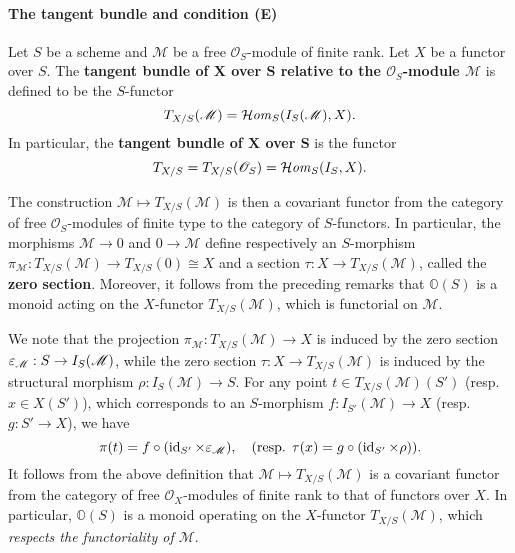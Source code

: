 \paragraph{The tangent bundle and condition (E)}
\begin{definition}
Let $S$ be a scheme and $\mathscr{M}$ be a free $\mathscr{O}_S$-module of finite rank. Let $X$ be a functor over $S$. The \textbf{tangent bundle of $\bm{X}$ over $\bm{S}$ relative to the $\mathscr{O}_S$-module $\mathscr{M}$} is defined to be the $S$-functor
\[T_{X/S}(\mathscr{M})=\operatorname{\mathcal{H}\hspace*{-0.4pt}\textit{om}\hspace{0.5pt}}_S(I_S(\mathscr{M}),X).\]
In particular, the \textbf{tangent bundle of $\bm{X}$ over $\bm{S}$} is the functor
\[T_{X/S}=T_{X/S}(\mathscr{O}_S)=\operatorname{\mathcal{H}\hspace*{-0.4pt}\textit{om}\hspace{0.5pt}}_S(I_S,X).\]
\end{definition}

The construction $\mathscr{M}\mapsto T_{X/S}(\mathscr{M})$ is then a covariant functor from the category of free $\mathscr{O}_S$-modules of finite type to the category of $S$-functors. In particular, the morphisms $\mathscr{M}\to 0$ and $0\to\mathscr{M}$ define respectively an $S$-morphism $\pi_\mathscr{M}:T_{X/S}(\mathscr{M})\to T_{X/S}(0)\cong X$ and a section $\tau:X\to T_{X/S}(\mathscr{M})$, called the \textbf{zero section}. Moreover, it follows from the preceding remarks that $\mathbb{O}(S)$ is a monoid acting on the $X$-functor $T_{X/S}(\mathscr{M})$, which is functorial on $\mathscr{M}$.

\begin{remark}\label{scheme tangent bundle projection zero section char}
We note that the projection $\pi_\mathscr{M}:T_{X/S}(\mathscr{M})\to X$ is induced by the zero section $\varepsilon_\mathscr{M}:S\to I_S(\mathscr{M})$, while the zero section $\tau:X\to T_{X/S}(\mathscr{M})$ is induced by the structural morphism $\rho:I_S(\mathscr{M})\to S$. For any point $t\in T_{X/S}(\mathscr{M})(S')$ (resp. $x\in X(S')$), which corresponds to an $S$-morphism $f:I_{S'}(\mathscr{M})\to X$ (resp. $g:S'\to X$), we have 
\[\pi(t)=f\circ(\operatorname{id}_{S'}\times\varepsilon_\mathscr{M}),\quad  \text{(resp. $\tau(x)=g\circ(\operatorname{id}_{S'}\times\rho)$)}.\]
It follows from the above definition that $\mathscr{M}\mapsto T_{X/S}(\mathscr{M})$ is a covariant functor from the category of free $\mathscr{O}_X$-modules of finite rank to that of functors over $X$. In particular, $\mathbb{O}(S)$ is a monoid operating on the $X$-functor $T_{X/S}(\mathscr{M})$, which \textit{respects the functoriality of $\mathscr{M}$}.
\end{remark}


